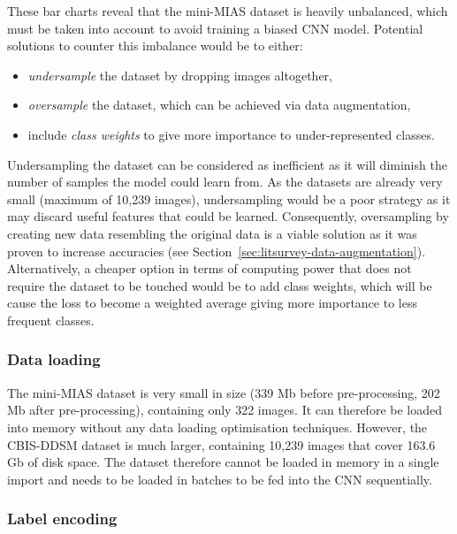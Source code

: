 These bar charts reveal that the mini-MIAS dataset is heavily unbalanced, which must be taken into account to avoid training a biased CNN model. Potential solutions to counter this imbalance would be to either:
\begin{itemize}
    \item \textit{undersample} the dataset by dropping images altogether,
    \item \textit{oversample} the dataset, which can be achieved via data augmentation,
    \item include \textit{class weights} to give more importance to under-represented classes. 
\end{itemize}

Undersampling the dataset can be considered as inefficient as it will diminish the number of samples the model could learn from. As the datasets are already very small (maximum of 10,239 images), undersampling would be a poor strategy as it may discard useful features that could be learned. Consequently, oversampling by creating new data resembling the original data is a viable solution as it was proven to increase accuracies (see Section~\ref{sec:litsurvey-data-augmentation}). Alternatively, a cheaper option in terms of computing power that does not require the dataset to be touched would be to add class weights, which will be cause the loss to become a weighted average giving more importance to less frequent classes.

\subsubsection{Data loading}

The mini-MIAS dataset is very small in size (339 Mb before pre-processing, 202 Mb after pre-processing), containing only 322 images. It can therefore be loaded into memory without any data loading optimisation techniques. However, the CBIS-DDSM dataset is much larger, containing 10,239 images that cover 163.6 Gb of disk space. The dataset therefore cannot be loaded in memory in a single import and needs to be loaded in batches to be fed into the CNN sequentially. %

\subsubsection{Label encoding}

